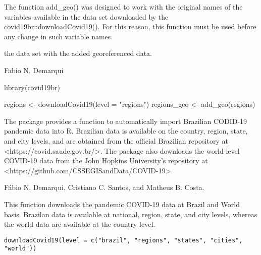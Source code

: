 \documentclass[letterpaper]{book}
\begin{document}
%
\begin{Details}\relax
The function add\_geo() was designed to work with the original names of the variables available in the data set downloaded by the covid19br::downloadCovid19(). For this reason, this function must be used before any change in such variable names.
\end{Details}
%
\begin{Value}
the data set with the added georeferenced data.
\end{Value}
%
\begin{Author}\relax
Fabio N. Demarqui 
\end{Author}
%
\begin{Examples}
\begin{ExampleCode}

library(covid19br)

regions <- downloadCovid19(level = "regions")
regions_geo <- add_geo(regions)


\end{ExampleCode}
\end{Examples}
%
\begin{Description}\relax
The package provides a function to automatically import  Brazilian CODID-19 pandemic data into R. Brazilian data is available on the country, region, state, and city levels, and are obtained from the official Brazilian repository at <https://covid.saude.gov.br/>. The package also downloads the world-level COVID-19 data from the John Hopkins University's repository at <https://github.com/CSSEGISandData/COVID-19>.
\end{Description}
%
\begin{Author}\relax
Fábio N. Demarqui, Cristiano C. Santos, and Matheus B. Costa.
\end{Author}
%
\begin{Description}\relax
This function downloads the pandemic COVID-19 data at Brazil and World basis. Brazilan data is available at national, region, state, and city levels, whereas the world data are available at the country level.
\end{Description}
%
\begin{Usage}
\begin{verbatim}
downloadCovid19(level = c("brazil", "regions", "states", "cities", "world"))
\end{verbatim}
\end{Usage}
\end{document}
